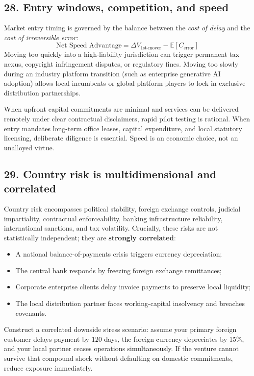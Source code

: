\subsection{28. Entry windows, competition, and speed}

Market entry timing is governed by the balance between the \textit{cost of delay} and the \textit{cost of irreversible error}:
\begin{equation}
\text{Net Speed Advantage} = \Delta V_{\text{1st-mover}} - \mathbb{E}[C_{\text{error}}]
\end{equation}
Moving too quickly into a high-liability jurisdiction can trigger permanent tax nexus, copyright infringement disputes, or regulatory fines. Moving too slowly during an industry platform transition (such as enterprise generative AI adoption) allows local incumbents or global platform players to lock in exclusive distribution partnerships.

When upfront capital commitments are minimal and services can be delivered remotely under clear contractual disclaimers, rapid pilot testing is rational. When entry mandates long-term office leases, capital expenditure, and local statutory licensing, deliberate diligence is essential. Speed is an economic choice, not an unalloyed virtue.

\subsection{29. Country risk is multidimensional and correlated}

Country risk encompasses political stability, foreign exchange controls, judicial impartiality, contractual enforceability, banking infrastructure reliability, international sanctions, and tax volatility. Crucially, these risks are not statistically independent; they are \textbf{strongly correlated}:
\begin{itemize}
    \item A national balance-of-payments crisis triggers currency depreciation;
    \item The central bank responds by freezing foreign exchange remittances;
    \item Corporate enterprise clients delay invoice payments to preserve local liquidity;
    \item The local distribution partner faces working-capital insolvency and breaches covenants.
\end{itemize}
Construct a correlated downside stress scenario: assume your primary foreign customer delays payment by 120 days, the foreign currency depreciates by 15\%, and your local partner ceases operations simultaneously. If the venture cannot survive that compound shock without defaulting on domestic commitments, reduce exposure immediately.

